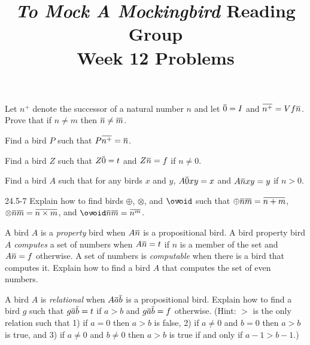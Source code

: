 \documentclass[12pt, letterpaper]{article}
\title{\emph{To Mock A Mockingbird} Reading Group\\Week 12 Problems}
\begin{document}
\maketitle

\disclaimer

\begin{prob}{24.1}
Let $n^+$ denote the successor of a natural number $n$ and let $\noverline{0} = I$ and $\noverline{n^+} = Vf\noverline{n}$. Prove that if $n \neq m$ then $\noverline{n} \neq \noverline{m}$. 
\end{prob}

\begin{prob}{24.2}
Find a bird $P$ such that $P\noverline{n^+} = \noverline{n}$.
\end{prob}

\begin{prob}{24.3}
Find a bird $Z$ such that $Z\noverline{0} = t$ and $Z\noverline{n} = f$ if $n \neq 0$. 
\end{prob}

\begin{prob}{24.4}
Find a bird $A$ such that for any birds $x$ and $y$, $A\noverline{0}xy = x$ and $A\noverline{n}xy = y$ if $n > 0$. 
\end{prob}

\begin{prob}{24.5-7}
Explain how to find birds $\oplus$, $\otimes$, and $\oexp$ such that $\oplus\noverline{n}\noverline{m} = \noverline{n + m}$, $\otimes\noverline{n}\noverline{m} = \noverline{n \times m}$, and $\oexp\noverline{n}\noverline{m} = \noverline{n^m}$.
\end{prob}

\begin{prob}{24.8}
A bird $A$ is a \emph{property} bird when $A\noverline{n}$ is a propositional bird. A bird property bird $A$ \emph{computes} a set of numbers when $A\noverline{n} = t$ if $n$ is a member of the set and $A\noverline{n} = f$ otherwise. A set of numbers is \emph{computable} when there is a bird that computes it. Explain how to find a bird $A$ that computes the set of even numbers.
\end{prob}

\begin{prob}{24.9}
A bird $A$ is \emph{relational} when $A\noverline{a}\noverline{b}$ is a propositional bird. Explain how to find a bird $g$ such that $g\noverline{a}\noverline{b} = t$ if $a > b$ and $g\noverline{a}\noverline{b} = f$ otherwise. (Hint: $>$ is the only relation such that 1) if $a = 0$ then $a > b$ is false, 2) if $a \neq 0$ and $b = 0$ then $a > b$ is true, and 3) if $a \neq 0$ and $b \neq 0$ then $a > b$ is true if and only if $a - 1 > b - 1$.)
\end{prob}
\end{document}
